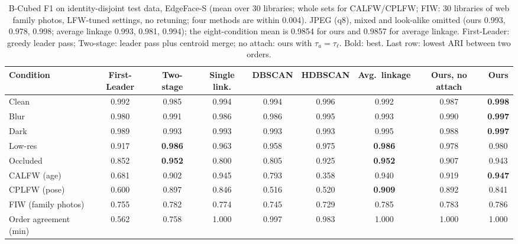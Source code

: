 \documentclass[conference]{IEEEtran}
\begin{document}
\begin{table}[t]
\caption{B-Cubed F1 on identity-disjoint test data, EdgeFace-S (mean over 30 libraries; whole sets for CALFW/CPLFW; FIW: 30 libraries of web family photos,
LFW-tuned settings, no retuning; four methods are within 0.004). JPEG (q8), mixed and look-alike omitted (ours 0.993, 0.978, 0.998; average linkage 0.993, 0.981, 0.994); the eight-condition mean is 0.9854 for ours and 0.9857 for average linkage. First-Leader: greedy leader pass; Two-stage: leader pass plus centroid merge; no attach: ours with
$\tau_a=\tau_\ell$. Bold: best. Last row: lowest ARI between two orders.}
\label{tab:acc}
\centering\small
\setlength{\tabcolsep}{5pt}
\begin{tabular}{lcccccccc}
\toprule
Condition & First-Leader & Two-stage & Single link. & DBSCAN & HDBSCAN & Avg.\ linkage & Ours, no attach & \textbf{Ours} \\
\midrule
Clean      & 0.992 & 0.985 & 0.994 & 0.994 & 0.996 & 0.992 & 0.987 & \textbf{0.998} \\
Blur       & 0.980 & 0.991 & 0.986 & 0.986 & 0.995 & 0.993 & 0.990 & \textbf{0.997} \\
Dark       & 0.989 & 0.993 & 0.993 & 0.993 & 0.993 & 0.995 & 0.988 & \textbf{0.997} \\
Low-res    & 0.917 & \textbf{0.986} & 0.963 & 0.958 & 0.975 & \textbf{0.986} & 0.978 & 0.980 \\
Occluded   & 0.852 & \textbf{0.952} & 0.800 & 0.805 & 0.925 & \textbf{0.952} & 0.907 & 0.943 \\
CALFW (age)  & 0.681 & 0.902 & 0.945 & 0.793 & 0.358 & 0.940 & 0.919 & \textbf{0.947} \\
CPLFW (pose) & 0.600 & 0.897 & 0.846 & 0.516 & 0.520 & \textbf{0.909} & 0.892 & 0.841 \\
FIW (family photos) & 0.755 & 0.782 & 0.774 & 0.745 & 0.729 & 0.785 & 0.783 & 0.786 \\
\midrule
Order agreement (min) & 0.562 & 0.758 & 1.000 & 0.997 & 0.983 & 1.000 & 1.000 & 1.000 \\
\bottomrule
\end{tabular}
\end{table}
\end{document}
